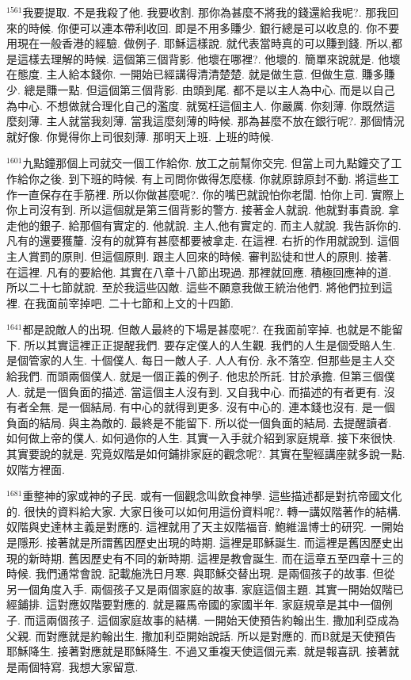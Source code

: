 \documentclass{book}
\begin{document}
$^{1561}$我要提取.
不是我殺了他.
我要收割.
那你為甚麼不將我的錢還給我呢?.
那我回來的時候.
你便可以連本帶利收回.
即是不用多賺少.
銀行總是可以收息的.
你不要用現在一般香港的經驗.
做例子.
耶穌這樣說.
就代表當時真的可以賺到錢.
所以,都是這樣去理解的時候.
這個第三個背影.
他壞在哪裡?.
他壞的.
簡單來說就是.
他壞在態度.
主人給本錢你.
一開始已經講得清清楚楚.
就是做生意.
但做生意.
賺多賺少.
總是賺一點.
但這個第三個背影.
由頭到尾.
都不是以主人為中心.
而是以自己為中心.
不想做就合理化自己的濫度.
就冤枉這個主人.
你嚴厲.
你刻薄.
你既然這麼刻薄.
主人就當我刻薄.
當我這麼刻薄的時候.
那為甚麼不放在銀行呢?.
那個情況就好像.
你覺得你上司很刻薄.
那明天上班.
上班的時候.

$^{1601}$九點鐘那個上司就交一個工作給你.
放工之前幫你交完.
但當上司九點鐘交了工作給你之後.
到下班的時候.
有上司問你做得怎麼樣.
你就原諒原封不動.
將這些工作一直保存在手筋裡.
所以你做甚麼呢?.
你的嘴巴就說怕你老闆.
怕你上司.
實際上你上司沒有到.
所以這個就是第三個背影的警方.
接著金人就說.
他就對事貴說.
拿走他的銀子.
給那個有實定的.
他就說.
主人,他有實定的.
而主人就說.
我告訴你的.
凡有的還要獲釐.
沒有的就算有甚麼都要被拿走.
在這裡.
右折的作用就說到.
這個主人賞罰的原則.
但這個原則.
跟主人回來的時候.
審判訟徒和世人的原則.
接著.
在這裡.
凡有的要給他.
其實在八章十八節出現過.
那裡就回應.
積極回應神的道.
所以二十七節就說.
至於我這些囚敵.
這些不願意我做王統治他們.
將他們拉到這裡.
在我面前宰掉吧.
二十七節和上文的十四節.

$^{1641}$都是說敵人的出現.
但敵人最終的下場是甚麼呢?.
在我面前宰掉.
也就是不能留下.
所以其實這裡正正提醒我們.
要存定僕人的人生觀.
我們的人生是個受賠人生.
是個管家的人生.
十個僕人.
每日一敵人子.
人人有份.
永不落空.
但那些是主人交給我們.
而頭兩個僕人.
就是一個正義的例子.
他忠於所託.
甘於承擔.
但第三個僕人.
就是一個負面的描述.
當這個主人沒有到.
又自我中心.
而描述的有者更有.
沒有者全無.
是一個結局.
有中心的就得到更多.
沒有中心的.
連本錢也沒有.
是一個負面的結局.
與主為敵的.
最終是不能留下.
所以從一個負面的結局.
去提醒讀者.
如何做上帝的僕人.
如何過你的人生.
其實一入手就介紹到家庭規章.
接下來很快.
其實要說的就是.
究竟奴階是如何鋪排家庭的觀念呢?.
其實在聖經講座就多說一點.
奴階方裡面.

$^{1681}$重整神的家或神的子民.
或有一個觀念叫飲食神學.
這些描述都是對抗帝國文化的.
很快的資料給大家.
大家日後可以如何用這份資料呢?.
轉一講奴階著作的結構.
奴階與史達林主義是對應的.
這裡就用了天主奴階福音.
鮑維溫博士的研究.
一開始是隱形.
接著就是所謂舊因歷史出現的時期.
這裡是耶穌誕生.
而這裡是舊因歷史出現的新時期.
舊因歷史有不同的新時期.
這裡是教會誕生.
而在這章五至四章十三的時候.
我們通常會說.
記載施洗日月寒.
與耶穌交替出現.
是兩個孩子的故事.
但從另一個角度入手.
兩個孩子又是兩個家庭的故事.
家庭這個主題.
其實一開始奴階已經鋪排.
這對應奴階要對應的.
就是羅馬帝國的家國半年.
家庭規章是其中一個例子.
而這兩個孩子.
這個家庭故事的結構.
一開始天使預告約翰出生.
撒加利亞成為父親.
而對應就是約翰出生.
撒加利亞開始說話.
所以是對應的.
而B就是天使預告耶穌降生.
接著對應就是耶穌降生.
不過又重複天使這個元素.
就是報喜訊.
接著就是兩個特寫.
我想大家留意.
\end{document}
